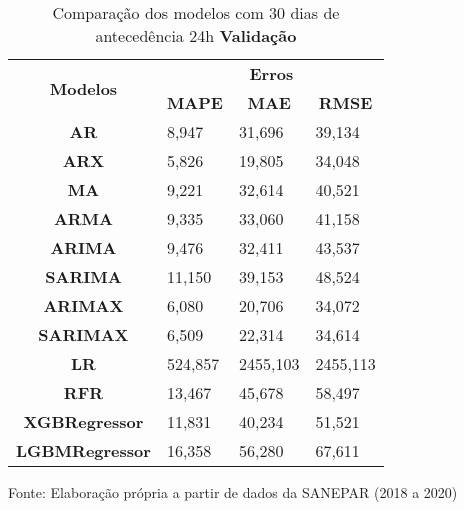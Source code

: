 \begin{table}[H]
	\centering
	\caption{Comparação dos modelos com 30 dias de antecedência 24h \textbf{Validação} }\label{tb:60-24vld}
	\begin{tabular}{@{}clll@{}}
		\toprule
		\multirow{2}{*}{\textbf{Modelos}} & \multicolumn{3}{c}{\textbf{Erros}}                                                                       \\ \cmidrule(l){2-4} 
		& \multicolumn{1}{c}{\textbf{MAPE}} & \multicolumn{1}{c}{\textbf{MAE}} & \multicolumn{1}{c}{\textbf{RMSE}} \\ \hline
\textbf{AR}                       & 8,947                             & 31,696                           & 39,134                            \\
\textbf{ARX}                      & 5,826                             & 19,805                           & 34,048                            \\
\textbf{MA}                       & 9,221                             & 32,614                           & 40,521                            \\
\textbf{ARMA}                     & 9,335                             & 33,060                           & 41,158                            \\
\textbf{ARIMA}                    & 9,476                             & 32,411                           & 43,537                            \\
\textbf{SARIMA}                   & 11,150                            & 39,153                           & 48,524                            \\
\textbf{ARIMAX}                   & 6,080                             & 20,706                           & 34,072                            \\
\textbf{SARIMAX}                  & 6,509                             & 22,314                           & 34,614                            \\
\textbf{LR}        & 524,857                           & 2455,103                         & 2455,113                          \\
\textbf{RFR}  & 13,467                            & 45,678                           & 58,497                            \\
\textbf{XGBRegressor}             & 11,831                            & 40,234                           & 51,521                            \\
\textbf{LGBMRegressor}            & 16,358                            & 56,280                           & 67,611                            \\ \bottomrule
	\end{tabular}

Fonte: Elaboração própria a partir de dados da SANEPAR (2018 a 2020)
\end{table}

